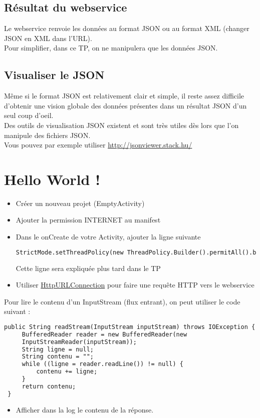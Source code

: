 \documentclass{article}
\begin{document}
\subsection{Résultat du webservice}
Le webservice renvoie les données au format JSON ou au format XML (changer
JSON en XML dans l'URL).\\
Pour simplifier, dans ce TP, on ne manipulera que les données JSON.
\subsection{Visualiser le JSON} 
Même si le format JSON est relativement clair et simple, il reste assez
difficile d'obtenir une vision globale des données présentes dans un résultat JSON d'un seul coup d'oeil.\\
Des outils de visualisation JSON existent et sont très utiles dès lors que l'on
manipule des fichiers JSON.\\
Vous pouvez par exemple utiliser
\href{http://jsonviewer.stack.hu/}{http://jsonviewer.stack.hu/}
\section{Hello World !}
\begin{itemize} 
  \item Créer un nouveau projet (EmptyActivity)
  \item Ajouter la permission INTERNET au manifest
  \item Dans le onCreate de votre Activity, ajouter la ligne suivante 
\begin{lstlisting}[language=XML]
StrictMode.setThreadPolicy(new ThreadPolicy.Builder().permitAll().build());
\end{lstlisting}
Cette ligne sera expliquée plus tard dans le TP
  \item Utiliser
  \href{http://developer.android.com/reference/java/net/HttpURLConnection.html}{HttpURLConnection}
  pour faire une requête HTTP vers le webservice
\end{itemize}
Pour lire le contenu d'un InputStream (flux entrant), on peut utiliser le code
suivant :
 \begin{lstlisting}[language=XML]
 public String readStream(InputStream inputStream) throws IOException {
     BufferedReader reader = new BufferedReader(new
     InputStreamReader(inputStream)); 
     String ligne = null;
     String contenu = "";
     while ((ligne = reader.readLine()) != null) {
         contenu += ligne;
     }
     return contenu;
 }
\end{lstlisting}
\begin{itemize} 
  \item Afficher dans la log le contenu de la réponse.
\end{itemize}
\end{document}
